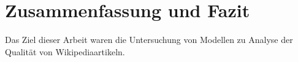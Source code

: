 \section{Zusammenfassung und Fazit}
Das Ziel dieser Arbeit waren die Untersuchung von Modellen zu Analyse der Qualität von Wikipediaartikeln.